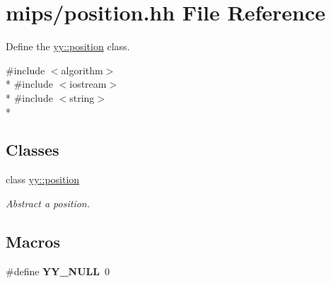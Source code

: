 \hypertarget{position_8hh}{\section{mips/position.hh File Reference}
\label{position_8hh}
}


Define the \hyperlink{classyy_1_1position}{yy\-::position} class.  


{\ttfamily \#include $<$algorithm$>$}\\*
{\ttfamily \#include $<$iostream$>$}\\*
{\ttfamily \#include $<$string$>$}\\*
\subsection*{Classes}
\begin{DoxyCompactItemize}
\item 
class \hyperlink{classyy_1_1position}{yy\-::position}
\begin{DoxyCompactList}\small\item\em Abstract a position. \end{DoxyCompactList}\end{DoxyCompactItemize}
\subsection*{Macros}
\begin{DoxyCompactItemize}
\item 
\hypertarget{position_8hh_a8e0bcf8f8a5b613ea583347f8bc31cbf}{\#define {\bfseries Y\-Y\-\_\-\-N\-U\-L\-L}~0}\label{position_8hh_a8e0bcf8f8a5b613ea583347f8bc31cbf}

\end{DoxyCompactItemize}
